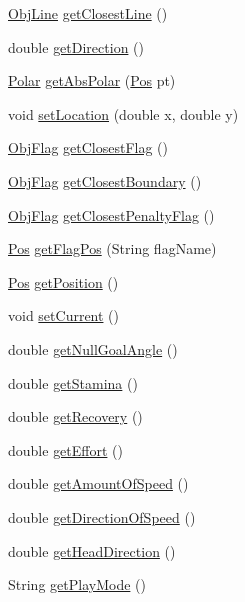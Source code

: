 \begin{DoxyCompactItemize}
\item 
\hyperlink{classObjLine}{ObjLine} \hyperlink{classMemory_a2daa67912fe6150db6242231b5c7f4a5}{getClosestLine} ()
\item 
double \hyperlink{classMemory_a51dd1c10ac4f0c6f70a40a7c302c9b10}{getDirection} ()
\item 
\hyperlink{classPolar}{Polar} \hyperlink{classMemory_a1a1d4ac309db69fbe854e13508a8205a}{getAbsPolar} (\hyperlink{classPos}{Pos} pt)
\item 
void \hyperlink{classMemory_a0f334995214212333a179c89662f53e1}{setLocation} (double x, double y)
\item 
\hyperlink{classObjFlag}{ObjFlag} \hyperlink{classMemory_a1813a252e55fd6d40821c8878caa25ca}{getClosestFlag} ()
\item 
\hyperlink{classObjFlag}{ObjFlag} \hyperlink{classMemory_af018362439405ab0d4aee31d8f8ca971}{getClosestBoundary} ()
\item 
\hyperlink{classObjFlag}{ObjFlag} \hyperlink{classMemory_a6a235443dd8654f5ed8e91298c4d1449}{getClosestPenaltyFlag} ()
\item 
\hyperlink{classPos}{Pos} \hyperlink{classMemory_a2248dbfdb1707931a4687ec056b12043}{getFlagPos} (String flagName)
\item 
\hyperlink{classPos}{Pos} \hyperlink{classMemory_ada2d3753c0323c6bc2a546792b8a58b2}{getPosition} ()
\item 
void \hyperlink{classMemory_a007baac0372d437de2f592fc5244e4e5}{setCurrent} ()
\item 
double \hyperlink{classMemory_a7a98332fa2d82e5108108c1240bf0afa}{getNullGoalAngle} ()
\item 
double \hyperlink{classMemory_a5caea216836d0a6bb068df6f99445e3c}{getStamina} ()
\item 
double \hyperlink{classMemory_a4301166648682fac690cd63db626e3c0}{getRecovery} ()
\item 
double \hyperlink{classMemory_a46b301f90943f20b72b31feddf679428}{getEffort} ()
\item 
double \hyperlink{classMemory_a6d95389ac90eb7682ddf8c9128118f48}{getAmountOfSpeed} ()
\item 
double \hyperlink{classMemory_a2ba03f42ed846e378252bb39153d415c}{getDirectionOfSpeed} ()
\item 
double \hyperlink{classMemory_a2b153c2ee50f4e2246862f359f1afdc8}{getHeadDirection} ()
\item 
String \hyperlink{classMemory_a8509d46b3402d337ebe54625fa8097aa}{getPlayMode} ()
\end{DoxyCompactItemize}
